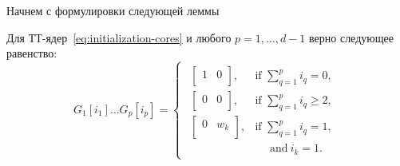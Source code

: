 Начнем с формулировки следующей леммы
\begin{lemma}
  \label{lemma:initialization-rank}
  Для ТТ-ядер~\eqref{eq:initialization-cores} и любого $p = 1, \ldots, d-1$ верно следующее равенство:
  \begin{equation*}
  G_1[i_1] \ldots G_p[i_p] =
  \begin{cases*}
      \begin{array}{ll}
      \left[
      \begin{array}{cc}
      1 & 0\\
      \end{array}
      \right], & \text{if } \sum_{q=1}^p i_q = 0,\\[0.1cm]
      \left[
      \begin{array}{cc}
      0 & 0\\
      \end{array}
      \right], & \text{if } \sum_{q=1}^p i_q \geq 2,\\[0.1cm]
      \left[
      \begin{array}{cc}
      0 & w_k\\
      \end{array}
      \right], & \text{if } \sum_{q=1}^p i_q = 1,\\
                          &~~~~~~\!\text{and}~i_k = 1.
  \end{array}
  \end{cases*}
  \end{equation*}
\end{lemma}

